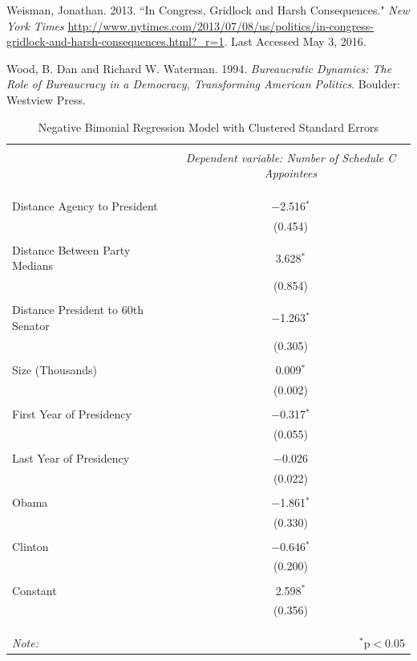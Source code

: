 \documentclass[12pt]{article}
\begin{document}
\noindent \hangindent=0.7cm Weisman, Jonathan. 2013. ``In Congress, Gridlock and Harsh Consequences." \textit{New York Times} \url{http://www.nytimes.com/2013/07/08/us/politics/in-congress-gridlock-and-harsh-consequences.html?_r=1}. Last Accessed May 3, 2016.

\noindent \hangindent=0.7cm Wood, B. Dan and Richard W. Waterman. 1994. \textit{Bureaucratic Dynamics: The Role of Bureaucracy in a Democracy, Transforming American Politics}. Boulder: Westview Press. 

\newpage
\begin{table}[!htbp] \centering 
  \caption{Negative Bimonial Regression Model with Clustered Standard Errors} 
  \label{} 
\begin{tabular}{@{\extracolsep{5pt}}lc} 
\\[-1.8ex]\hline 
\hline \\[-1.8ex] 
 & \multicolumn{1}{c}{\textit{Dependent variable: Number of Schedule C Appointees}} \\ 
\cline{2-2} 
\\[-1.8ex] &   \\ 
\hline \\[-1.8ex] 
 Distance Agency to President & $-$2.516$^{*}$ \\ 
  & (0.454) \\ 
  & \\ 
 Distance Between Party Medians & 3.628$^{*}$ \\ 
  & (0.854) \\ 
  & \\ 
 Distance President to 60th Senator & $-$1.263$^{*}$ \\ 
  & (0.305) \\ 
  & \\ 
 Size (Thousands) & 0.009$^{*}$ \\ 
  & (0.002) \\ 
  & \\ 
 First Year of Presidency & $-$0.317$^{*}$ \\ 
  & (0.055) \\ 
  & \\ 
 Last Year of Presidency & $-$0.026 \\ 
  & (0.022) \\ 
  & \\ 
 Obama & $-$1.861$^{*}$ \\ 
  & (0.330) \\ 
  & \\ 
 Clinton & $-$0.646$^{*}$ \\ 
  & (0.200) \\ 
  & \\ 
 Constant & 2.598$^{*}$ \\ 
  & (0.356) \\ 
  & \\ 
\hline \\[-1.8ex] 
\hline 
\hline \\[-1.8ex] 
\textit{Note:}  & \multicolumn{1}{r}{$^{*}$p$<$0.05} \\ 
\end{tabular} 
\end{table} 
\end{document}

